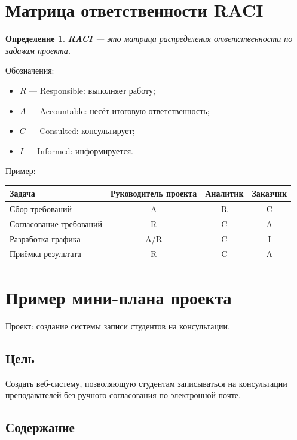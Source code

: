 \documentclass[12pt,a4paper]{article}
\newtheorem{definition}{Определение}
\begin{document}
\section{Матрица ответственности RACI}

\begin{definition}
\textbf{RACI} --- это матрица распределения ответственности по задачам проекта.
\end{definition}

Обозначения:
\begin{itemize}
    \item $R$ --- Responsible: выполняет работу;
    \item $A$ --- Accountable: несёт итоговую ответственность;
    \item $C$ --- Consulted: консультирует;
    \item $I$ --- Informed: информируется.
\end{itemize}

Пример:

\begin{center}
\begin{tabular}{|p{4cm}|c|c|c|}
\hline
Задача & Руководитель проекта & Аналитик & Заказчик \\
\hline
Сбор требований & A & R & C \\
\hline
Согласование требований & R & C & A \\
\hline
Разработка графика & A/R & C & I \\
\hline
Приёмка результата & R & C & A \\
\hline
\end{tabular}
\end{center}

\section{Пример мини-плана проекта}

Проект: создание системы записи студентов на консультации.

\subsection*{Цель}

Создать веб-систему, позволяющую студентам записываться на консультации преподавателей без ручного согласования по электронной почте.

\subsection*{Содержание}
\end{document}
